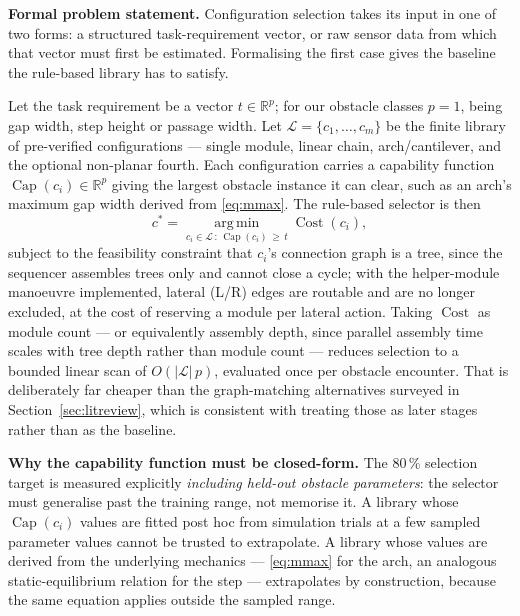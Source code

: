 \documentclass[11pt,a4paper]{article}
\newif\ifreview
\newcommand{\pending}[1]{\ifreview{\color{blue}#1}\else#1\fi}
\newcounter{gsec}
\newcounter{gsub}
\newcommand{\curgsec}{}
\newcommand{\gsep}{\texorpdfstring{\quad}{ }}
\newcommand{\gtocsub}[2]{%
  \phantomsection
  \addcontentsline{toc}{subsection}{#1\gsep #2}%
}
\newcommand{\gsubsection}[1]{%
  \refstepcounter{gsub}%
  \edef\gsublbl{\curgsec.\thegsub}%
  \expandafter\gtocsub\expandafter{\gsublbl}{#1}%
  \subsection*{\gsublbl\quad #1}%
}
\begin{document}
\pending{}

\pending{%
\noindent\textbf{Formal problem statement.} Configuration selection takes its
input in one of two forms: a structured task-requirement vector, or raw sensor
data from which that vector must first be estimated. Formalising the first case
gives the baseline the rule-based library has to satisfy.

Let the task requirement be a vector $t \in \mathbb{R}^p$; for our obstacle
classes $p = 1$, being gap width, step height or passage width. Let
$\mathcal{L} = \{c_1,\dots,c_m\}$ be the finite library of pre-verified
configurations --- single module, linear chain, arch/cantilever, and the
optional non-planar fourth. Each configuration carries a capability function
$\operatorname{Cap}(c_i) \in \mathbb{R}^p$ giving the largest obstacle instance
it can clear, such as an arch's maximum gap width derived from
\eqref{eq:mmax}. The rule-based selector is then
\begin{equation}
  c^{\ast} = \operatorname*{arg\,min}_{c_i \in \mathcal{L}\,:\,
    \operatorname{Cap}(c_i)\, \geq\, t} \operatorname{Cost}(c_i),
  \label{eq:selector}
\end{equation}
subject to the feasibility constraint that $c_i$'s connection graph is a tree,
since the sequencer assembles trees only and cannot close a cycle; with the
helper-module manoeuvre implemented, lateral (L/R) edges are routable and are
no longer excluded, at the cost of reserving a module per lateral action.
Taking
$\operatorname{Cost}$ as module count --- or equivalently assembly depth, since
parallel assembly time scales with tree depth rather than module count ---
reduces selection to a bounded linear scan of $O(|\mathcal{L}|\,p)$, evaluated
once per obstacle encounter. That is deliberately far cheaper than the
graph-matching alternatives surveyed in Section~\ref{sec:litreview}, which is
consistent with treating those as later stages rather than as the baseline.

\noindent\textbf{Why the capability function must be closed-form.} The
80\,\% selection target is measured explicitly \emph{including held-out
obstacle parameters}: the selector must generalise past the training range, not
memorise it. A library whose $\operatorname{Cap}(c_i)$ values are fitted post
hoc from simulation trials at a few sampled parameter values cannot be trusted
to extrapolate. A library whose values are derived from the underlying
mechanics --- \eqref{eq:mmax} for the arch, an analogous static-equilibrium
relation for the step --- extrapolates by construction, because the same
equation applies outside the sampled range.

}
\end{document}
